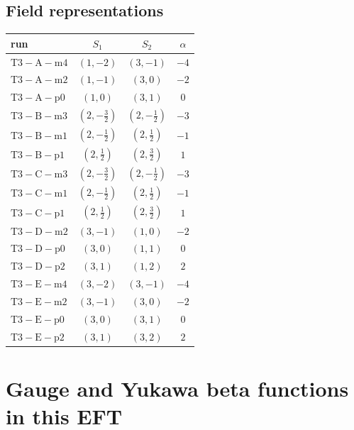 \documentclass[9pt]{article}
\begin{document}
\subsection*{Field representations}
\begin{longtable}{@{}lccc@{}}
\toprule
run & $S_1$ & $S_2$ & $\alpha$ \\
\midrule
$\mathrm{T3-A-m4}$ & $(1,-2)$ & $(3,-1)$ & $-4$ \\
$\mathrm{T3-A-m2}$ & $(1,-1)$ & $(3,0)$ & $-2$ \\
$\mathrm{T3-A-p0}$ & $(1,0)$ & $(3,1)$ & $0$ \\
$\mathrm{T3-B-m3}$ & $(2,- \frac{3}{2})$ & $(2,- \frac{1}{2})$ & $-3$ \\
$\mathrm{T3-B-m1}$ & $(2,- \frac{1}{2})$ & $(2,\frac{1}{2})$ & $-1$ \\
$\mathrm{T3-B-p1}$ & $(2,\frac{1}{2})$ & $(2,\frac{3}{2})$ & $1$ \\
$\mathrm{T3-C-m3}$ & $(2,- \frac{3}{2})$ & $(2,- \frac{1}{2})$ & $-3$ \\
$\mathrm{T3-C-m1}$ & $(2,- \frac{1}{2})$ & $(2,\frac{1}{2})$ & $-1$ \\
$\mathrm{T3-C-p1}$ & $(2,\frac{1}{2})$ & $(2,\frac{3}{2})$ & $1$ \\
$\mathrm{T3-D-m2}$ & $(3,-1)$ & $(1,0)$ & $-2$ \\
$\mathrm{T3-D-p0}$ & $(3,0)$ & $(1,1)$ & $0$ \\
$\mathrm{T3-D-p2}$ & $(3,1)$ & $(1,2)$ & $2$ \\
$\mathrm{T3-E-m4}$ & $(3,-2)$ & $(3,-1)$ & $-4$ \\
$\mathrm{T3-E-m2}$ & $(3,-1)$ & $(3,0)$ & $-2$ \\
$\mathrm{T3-E-p0}$ & $(3,0)$ & $(3,1)$ & $0$ \\
$\mathrm{T3-E-p2}$ & $(3,1)$ & $(3,2)$ & $2$ \\
\bottomrule
\end{longtable}
\section*{Gauge and Yukawa beta functions in this EFT}
\end{document}
